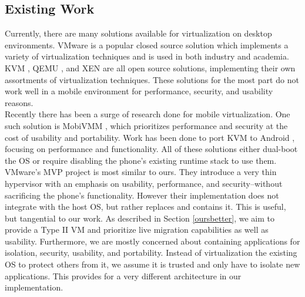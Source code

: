 \subsection{Existing Work}
Currently, there are many solutions available for virtualization on desktop environments.  VMware is a popular closed source solution which implements a variety of virtualization techniques and is used in both industry and academia.  KVM \cite{kvm}, QEMU \cite{qemu}, and XEN \cite{xen} are all open source solutions, implementing their own assortments of virtualization techniques.  These solutions for the most part do not work well in a mobile environment for performance, security, and usability reasons. \\

Recently there has been a surge of research done for mobile virtualization.  One such solution is MobiVMM \cite{mobivmm}, which prioritizes performance and security at the cost of usability and portability.  Work has been done to port KVM to Android \cite{columbia}, focusing on performance and functionality.  All of these solutions either dual-boot the OS or require disabling the phone's existing runtime stack to use them. \\

VMware's MVP project \cite{mvp} is most similar to ours.  They introduce a very thin hypervisor with an emphasis on usability, performance, and security--without sacrificing the phone's functionality.   However their implementation does not integrate with the host OS, but rather replaces and contains it.  This is useful, but tangential to our work.  As described in Section \ref{oursbetter}, we aim to provide a Type II VM and prioritize live migration capabilities as well as usability.  Furthermore, we are mostly concerned about containing applications for isolation, security, usability, and portability.  Instead of virtualization the existing OS to protect others from it, we assume it is trusted and only have to isolate new applications.  This provides for a very different architecture in our implementation. \\

